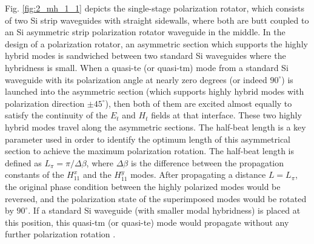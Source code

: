 \documentclass[../report.tex]{subfiles}
\begin{document}
\begin{itemize}[leftmargin=*]
	Fig. \ref{fig:2_mh_1_1} depicts the single-stage polarization rotator, which consists of two Si strip waveguides with straight sidewalls, where both are butt coupled to an Si asymmetric strip polarization rotator waveguide in the middle. In the design of a polarization rotator, an asymmetric section which supports the highly hybrid modes is sandwiched between two standard Si waveguides where the hybridness is small. When a quasi-\gls{te} (or quasi-\gls{tm}) mode from a standard Si waveguide with its polarization angle at nearly zero degrees (or indeed $90^{\circ}$) is launched into the asymmetric section (which supports highly hybrid modes with polarization direction $\pm 45^{\circ }$), then both of them are excited almost equally to satisfy the continuity of the $E_t$ and $H_t$ fields at that interface. These two highly hybrid modes travel along the asymmetric sections. The half-beat length is a key parameter used in order to identify the optimum length of this asymmetrical section to achieve the maximum polarization rotation. The half-beat length is defined as $L_{\pi }= \pi / \Delta \beta$, where $\Delta \beta$ is the difference between the propagation constants of the $H_{11}^x$ and the $H_{11}^y$ modes. After propagating a distance $L = L_{\pi}$, the original phase condition between the highly polarized modes would be reversed, and the polarization state of the superimposed modes would be rotated by $90^{\circ}$. If a standard Si waveguide (with smaller modal hybridness) is placed at this position, this quasi-\gls{tm} (or quasi-\gls{te}) mode would propagate without any further polarization rotation \cite{leung_numerical_2011}.
	

\end{itemize}
\end{document}

